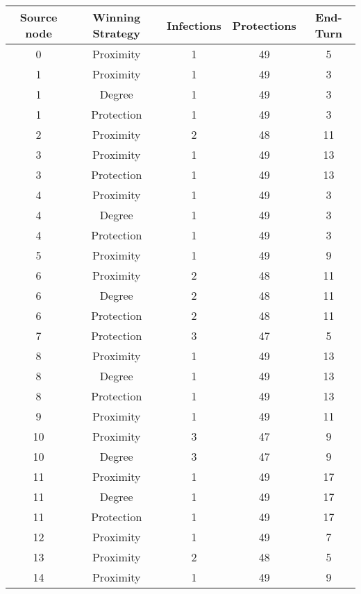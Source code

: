 \documentclass[results.tex]{subfiles}
\begin{document}
\begin{center}
  \begin{tabular}{| c || c | c | c | c |}
    \hline
    {\bfseries Source node} & {\bfseries Winning Strategy} & {\bfseries Infections} & {\bfseries Protections} & {\bfseries End-Turn} \\  %
    \hline\hline
    0 & Proximity & 1 & 49 & 5 \\ 
    \hline
    1 & Proximity & 1 & 49 & 3 \\ 
    \hline
    1 & Degree & 1 & 49 & 3 \\ 
    \hline
    1 & Protection & 1 & 49 & 3 \\ 
    \hline
    2 & Proximity & 2 & 48 & 11 \\ 
    \hline
    3 & Proximity & 1 & 49 & 13 \\ 
    \hline
    3 & Protection & 1 & 49 & 13 \\ 
    \hline
    4 & Proximity & 1 & 49 & 3 \\ 
    \hline
    4 & Degree & 1 & 49 & 3 \\ 
    \hline
    4 & Protection & 1 & 49 & 3 \\ 
    \hline
    5 & Proximity & 1 & 49 & 9 \\ 
    \hline
    6 & Proximity & 2 & 48 & 11 \\ 
    \hline
    6 & Degree & 2 & 48 & 11 \\ 
    \hline
    6 & Protection & 2 & 48 & 11 \\ 
    \hline
    7 & Protection & 3 & 47 & 5 \\ 
    \hline
    8 & Proximity & 1 & 49 & 13 \\ 
    \hline
    8 & Degree & 1 & 49 & 13 \\ 
    \hline
    8 & Protection & 1 & 49 & 13 \\ 
    \hline
    9 & Proximity & 1 & 49 & 11 \\ 
    \hline
    10 & Proximity & 3 & 47 & 9 \\ 
    \hline
    10 & Degree & 3 & 47 & 9 \\ 
    \hline
    11 & Proximity & 1 & 49 & 17 \\ 
    \hline
    11 & Degree & 1 & 49 & 17 \\ 
    \hline
    11 & Protection & 1 & 49 & 17 \\ 
    \hline
    12 & Proximity & 1 & 49 & 7 \\ 
    \hline
    13 & Proximity & 2 & 48 & 5 \\ 
    \hline
    14 & Proximity & 1 & 49 & 9 \\ 

\end{tabular}
\end{center}
\end{document}
